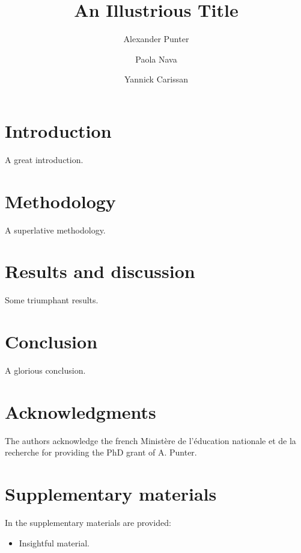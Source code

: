 \documentclass[aip,reprint]{revtex4-1}
\begin{document}
\title{An Illustrious Title}
\author{Alexander Punter}
\author{Paola Nava}
\author{Yannick Carissan}



\section{Introduction}

A great introduction.

\section{Methodology}

A superlative methodology.

\section{Results and discussion}

Some triumphant results.

\section{Conclusion}

A glorious conclusion.

\section{Acknowledgments}
The authors acknowledge the french Ministère de l'éducation
nationale et de la recherche for providing the PhD grant of A. Punter.

\section{Supplementary materials}
In the supplementary materials are provided:
\begin{itemize}
\item Insightful material.
\end{itemize}


\end{document}
